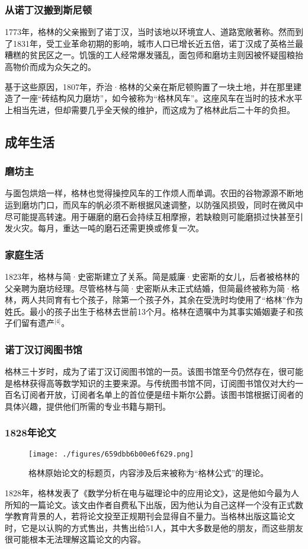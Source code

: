 \subsubsection{从诺丁汉搬到斯尼顿}
1773年，格林的父亲搬到了诺丁汉，当时该地以环境宜人、道路宽敞著称。然而到了1831年，受工业革命初期的影响，城市人口已增长近五倍，诺丁汉成了英格兰最糟糕的贫民区之一。饥饿的工人经常爆发骚乱，面包师和磨坊主则因被怀疑囤粮抬高物价而成为众矢之的。

基于这些原因，1807年，乔治·格林的父亲在斯尼顿购置了一块土地，并在那里建造了一座“砖结构风力磨坊”，如今被称为“格林风车”。这座风车在当时的技术水平上相当先进，但却需要几乎全天候的维护，而这成为了格林此后二十年的负担。
\subsection{成年生活}
\subsubsection{磨坊主}
与面包烘焙一样，格林也觉得操控风车的工作烦人而单调。农田的谷物源源不断地运到磨坊门口，而风车的帆必须不断根据风速调整，以防强风损毁，同时在微风中尽可能提高转速。用于碾磨的磨石会持续互相摩擦，若缺粮则可能磨损过快甚至引发火灾。每月，重达一吨的磨石还需更换或修复一次。
\subsubsection{家庭生活}
1823年，格林与简·史密斯建立了关系。简是威廉·史密斯的女儿，后者被格林的父亲聘为磨坊经理。尽管格林与简·史密斯从未正式结婚，但简最终被称为简·格林，两人共同育有七个孩子，除第一个孩子外，其余在受洗时均使用了“格林”作为姓氏。最小的孩子出生于格林去世前13个月。格林在遗嘱中为其事实婚姻妻子和孩子们留有遗产\(^\text{[4]}\)。
\subsubsection{诺丁汉订阅图书馆}
格林三十岁时，成为了诺丁汉订阅图书馆的一员。该图书馆至今仍然存在，很可能是格林获得高等数学知识的主要来源。与传统图书馆不同，订阅图书馆仅对大约一百名订阅者开放，订阅者名单上的首位便是纽卡斯尔公爵。该图书馆根据订阅者的具体兴趣，提供他们所需的专业书籍与期刊。
\subsubsection{1828年论文}
\begin{figure}[ht]
\centering
\texttt{[image: ./figures/659dbb6b00e6f629.png]}
\caption{格林原始论文的标题页，内容涉及后来被称为“格林公式”的理论。} \label{fig_QZgl_2}
\end{figure}
1828年，格林发表了《数学分析在电与磁理论中的应用论文》，这是他如今最为人所知的一篇论文。该文由作者自费私下出版，因为他认为自己这样一个没有正式数学教育背景的人，若将论文投至正规期刊会显得自不量力。当格林出版这篇论文时，它是以认购的方式售出，共售出给51人，其中大多数是他的朋友，而这些朋友很可能根本无法理解这篇论文的内容。

